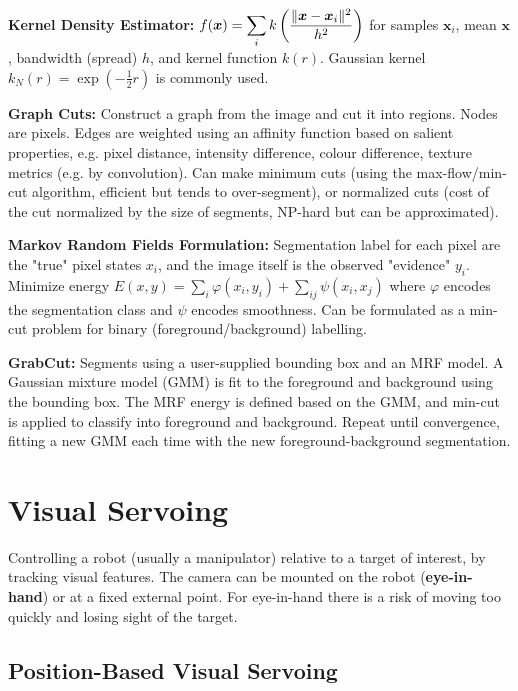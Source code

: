 \documentclass[twocolumn, 10pt]{extarticle}
\begin{document}
\textbf{Kernel Density Estimator:} $\displaystyle f(\bm x) = \sum _i k\left(\frac{\lVert\bm x - \bm x_i\rVert^2}{h^2}\right)$
for samples $\bm x_i$, mean $\bm x$, bandwidth (spread) \(h\), and kernel function \(k(r)\).
Gaussian kernel $\displaystyle k_N(r) = \exp\left(-\frac{1}{2}r\right)$ is commonly used.

\textbf{Graph Cuts:} Construct a graph from the image and cut it into regions. Nodes are pixels. Edges are weighted
using an affinity function based on salient properties, e.g. pixel distance, intensity difference, colour difference,
texture metrics (e.g. by convolution). Can make minimum cuts (using the max-flow/min-cut algorithm, efficient but tends
to over-segment), or normalized cuts (cost of the cut normalized by the size of segments, NP-hard but can be
approximated).

\textbf{Markov Random Fields Formulation:} Segmentation label for each pixel are the "true" pixel states \(x_i\), and
the image itself is the observed "evidence" \(y_i\). Minimize energy $E(x, y) = \sum _i \varphi(x_i, y_i) + \sum
_{ij}\psi(x_i, x_j)$ where \(\varphi\) encodes the segmentation class and \(\psi\) encodes smoothness. Can be formulated
as a min-cut problem for binary (foreground/background) labelling.

\textbf{GrabCut:} Segments using a user-supplied bounding box and an MRF model. A Gaussian mixture model (GMM) is fit to
the foreground and background using the bounding box. The MRF energy is defined based on the GMM, and min-cut is applied
to classify into foreground and background. Repeat until convergence, fitting a new GMM each time with the new
foreground-background segmentation.

\section{Visual Servoing} %

Controlling a robot (usually a manipulator) relative to a target of interest, by tracking visual features. The camera
can be mounted on the robot (\textbf{eye-in-hand}) or at a fixed external point. For eye-in-hand there is a risk of
moving too quickly and losing sight of the target.

\subsection{Position-Based Visual Servoing}
\end{document}
